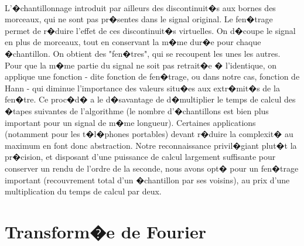 \paragraph{}
	L'�chantillonnage introduit par ailleurs des discontinuit�s aux bornes des morceaux, qui ne sont pas pr�sentes 
	dans le signal original. Le fen�trage permet de r�duire l'effet de ces discontinuit�s virtuelles. 
	On d�coupe le signal en plus de morceaux, tout en conservant la m�me dur�e pour chaque �chantillon. 
	On obtient des "fen�tres", qui se recoupent les unes les autres. 
	Pour que la m�me partie du signal ne soit pas retrait�e � l'identique, 
	on applique une fonction - dite fonction de fen�trage, ou dans notre cas, fonction de Hann - 
	qui diminue l'importance des valeurs situ�es aux extr�mit�s de la fen�tre. 
	Ce proc�d� a le d�savantage de d�multiplier le temps de calcul des �tapes suivantes de 
	l'algorithme (le nombre d'�chantillons est bien plus important pour un signal de m�me longueur). 
	Certaines applications (notamment pour les t�l�phones portables) devant r�duire la complexit� au 
	maximum en font donc abstraction. Notre reconnaissance privil�giant plut�t la pr�cision, et 
	disposant d'une puissance de calcul largement suffisante pour conserver un rendu de l'ordre de 
	la seconde, nous avons opt� pour un fen�trage important (recouvrement total d'un �chantillon par ses voisins), 
	au prix d'une multiplication du temps de calcul par deux.

        	\section{Transform�e de Fourier}
